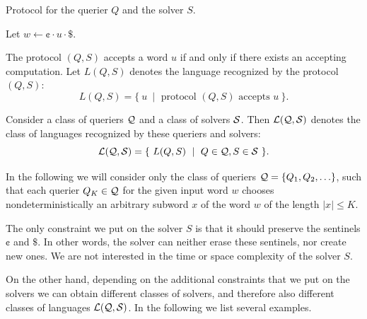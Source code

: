 \begin{algorithm}
\caption{Protocol for the querier $Q$ and the solver $S$.}
\label{algorithm:dxclra_protocol}
\DontPrintSemicolon
\LinesNumbered
{}
\nonl Let $w \leftarrow \cent \cdot u \cdot \$$.\;
\nonl {}
\end{algorithm}

The protocol $(Q, S)$ accepts a word $u$ if and only if there exists an accepting computation. Let $L(Q, S)$ denotes the language recognized by the protocol $(Q, S)$:
$$L(Q, S) = \{\ u\ \mid \text{ protocol } (Q, S) \text{ accepts } u\ \}.$$

Consider a class of queriers $\mathcal{Q}$ and a class of solvers $\mathcal{S}$. Then ${\cal L}(\mathcal{Q}, \mathcal{S})$ denotes the class of languages recognized by these queriers and solvers:
$${\cal L}(\mathcal{Q}, \mathcal{S}) = \{\ L(Q, S)\ \mid\  Q \in \mathcal{Q}, S \in \mathcal{S}\ \}.$$

In the following we will consider only the class of queriers $\mathcal{Q} = \{Q_1, Q_2, \ldots\}$, such that each querier $Q_K \in \mathcal{Q}$ for the given input word $w$ chooses nondeterministically an arbitrary subword $x$ of the word $w$ of the length $|x| \le K$.

The only constraint we put on the solver $S$ is that it should preserve the sentinels $\cent$ and $\$$. In other words, the solver can neither erase these sentinels, nor create new ones. We are not interested in the time or space complexity of the solver $S$.

On the other hand, depending on the additional constraints that we put on the solvers we can obtain different classes of solvers, and therefore also different classes of languages ${\cal L}(\mathcal{Q}, \mathcal{S})$. In the following we list several examples.

